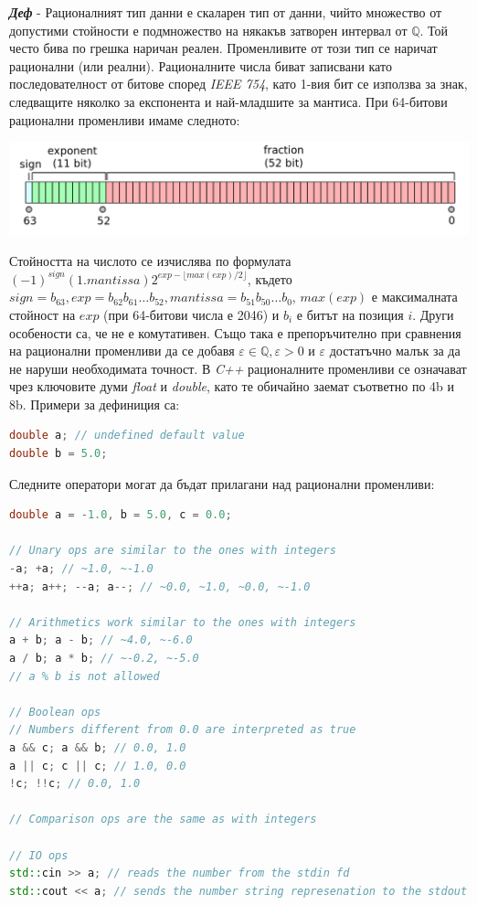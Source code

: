 \documentclass[fleqn,12pt]{article}
\begin{document}
\noindent \textit{\textbf{Деф}} - Рационалният тип данни е скаларен тип от данни, чийто множество от допустими стойности е подмножество на някакъв затворен интервал от $\mathbb{Q}$.
Той често бива по грешка наричан реален. Променливите от този тип се наричат рационални (или реални).
Рационалните числа биват записвани като последователност от битове според \textit{IEEE 754}, като 1-вия бит се използва за знак, следващите няколко за експонента и най-младшите за мантиса.
При 64-битови рационални променливи имаме следното:

\includegraphics[width=\textwidth]{floating_point_num.png}

Стойността на числото се изчислява по формулата $(-1)^{sign} (1.mantissa) 2^{exp - \lfloor max(exp)/2 \rfloor}$, където $sign = b_{63}, exp = b_{62}b_{61} \dots b_{52}, mantissa = b_{51}b_{50} \dots b_{0}$, $max(exp)$ е максималната стойност на $exp$ (при 64-битови числа е 2046) и $b_i$ е битът на позиция $i$.
\bigbreak
Други особености са, че не е комутативен. Също така е препоръчително при сравнения на рационални променливи да се добавя $\varepsilon \in \mathbb{Q}, \varepsilon > 0$ и $\varepsilon$ достатъчно малък за да не наруши необходимата точност.
\bigbreak
В \textit{C++} рационалните променливи се означават чрез ключовите думи \textit{float} и \textit{double}, като те обичайно заемат съответно по 4b и 8b. Примери за дефиниция са:

\begin{lstlisting}[language=C++, caption=Real numbers]
double a; // undefined default value
double b = 5.0;
\end{lstlisting}

Следните оператори могат да бъдат прилагани над рационални променливи:

\begin{lstlisting}[language=C++, caption=Real number operations]
double a = -1.0, b = 5.0, c = 0.0;

// Unary ops are similar to the ones with integers
-a; +a; // ~1.0, ~-1.0
++a; a++; --a; a--; // ~0.0, ~1.0, ~0.0, ~-1.0

// Arithmetics work similar to the ones with integers
a + b; a - b; // ~4.0, ~-6.0
a / b; a * b; // ~-0.2, ~-5.0
// a % b is not allowed

// Boolean ops
// Numbers different from 0.0 are interpreted as true
a && c; a && b; // 0.0, 1.0
a || c; c || c; // 1.0, 0.0
!c; !!c; // 0.0, 1.0

// Comparison ops are the same as with integers

// IO ops
std::cin >> a; // reads the number from the stdin fd
std::cout << a; // sends the number string represenation to the stdout fd
\end{lstlisting}
\end{document}
